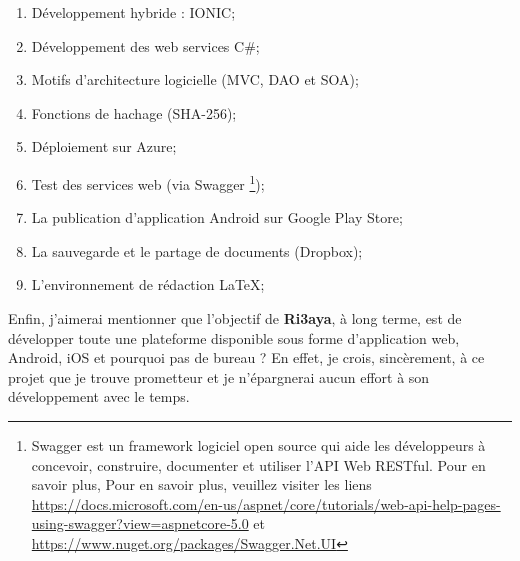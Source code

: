\begin{enumerate}
	\item Développement hybride : IONIC;
	\item Développement des web services C\#;
	\item Motifs d'architecture logicielle (\gls{MVC}, \gls{DAO} et \gls{SOA});
	\item Fonctions de hachage (SHA-256);
	\item Déploiement sur Azure;
	\item Test des services web (via Swagger \footnote{Swagger est un framework logiciel open source qui aide les développeurs à concevoir, construire, documenter et utiliser l’API Web RESTful. Pour en savoir plus, Pour en savoir plus, veuillez visiter les liens
	\href{https://docs.microsoft.com/en-us/aspnet/core/tutorials/web-api-help-pages-using-swagger?view=aspnetcore-5.0}{https://docs.microsoft.com/en-us/aspnet/core/tutorials/web-api-help-pages-using-swagger?view=aspnetcore-5.0} et 
	\href{https://www.nuget.org/packages/Swagger.Net.UI}{https://www.nuget.org/packages/Swagger.Net.UI}
	});
	\item La publication d’application Android sur Google Play Store;
	\item La sauvegarde et le partage de documents (Dropbox);
	\item L’environnement de rédaction LaTeX;
\end{enumerate}

Enfin, j'aimerai mentionner que l’objectif de \textbf{Ri3aya}, à long terme, est de développer toute une plateforme disponible sous forme d’application web, Android, iOS et pourquoi pas de bureau ? \newline
En effet, je crois, sincèrement, à ce projet que je trouve prometteur et je n’épargnerai aucun effort à son développement avec le temps.